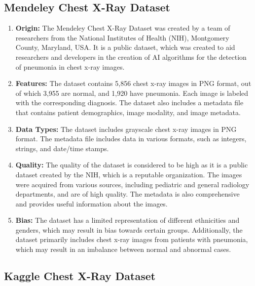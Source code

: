 \subsection{Mendeley Chest X-Ray Dataset}

\begin{enumerate}
	\item \textbf{Origin:} The Mendeley Chest X-Ray Dataset was created by a team of researchers from the National Institutes of Health (NIH), Montgomery County, Maryland, USA. It is a public dataset, which was created to aid researchers and developers in the creation of AI algorithms for the detection of pneumonia in chest x-ray images.\autocite{Cohen:2017}

\item \textbf{Features:} The dataset contains 5,856 chest x-ray images in PNG format, out of which 3,955 are normal, and 1,920 have pneumonia. Each image is labeled with the corresponding diagnosis. The dataset also includes a metadata file that contains patient demographics, image modality, and image metadata.\\

\item \textbf{Data Types:} The dataset includes grayscale chest x-ray images in PNG format. The metadata file includes data in various formats, such as integers, strings, and date/time stamps.\\

\item \textbf{Quality:} The quality of the dataset is considered to be high as it is a public dataset created by the NIH, which is a reputable organization. The images were acquired from various sources, including pediatric and general radiology departments, and are of high quality. The metadata is also comprehensive and provides useful information about the images.\\

\item \textbf{Bias:} The dataset has a limited representation of different ethnicities and genders, which may result in bias towards certain groups. Additionally, the dataset primarily includes chest x-ray images from patients with pneumonia, which may result in an imbalance between normal and abnormal cases.\\

\end{enumerate}

\subsection{Kaggle Chest X-Ray Dataset}

